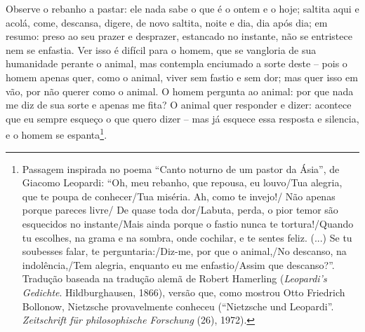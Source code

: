 Observe o rebanho a pastar: ele nada sabe o que é o ontem e o hoje;
saltita aqui e acolá, come, descansa, digere, de novo saltita, noite e
dia, dia após dia; em resumo: preso ao seu prazer e desprazer, estancado
no instante, não se entristece nem se enfastia. Ver isso é difícil para
o homem, que se vangloria de sua humanidade perante o animal, mas
contempla enciumado a sorte deste -- pois o homem apenas quer, como o
animal, viver sem fastio e sem dor; mas quer isso em vão, por não querer
como o animal. O homem pergunta ao animal: por que nada me diz de sua
sorte e apenas me fita? O animal quer responder e dizer: acontece que eu
sempre esqueço o que quero dizer -- mas já esquece essa resposta e
silencia, e o homem se espanta\footnote{Passagem inspirada no poema
  ``Canto noturno de um pastor da Ásia'', de Giacomo Leopardi: ``Oh, meu
  rebanho, que repousa, eu louvo/Tua alegria, que te poupa de
  conhecer/Tua miséria. Ah, como te invejo!/ Não apenas porque pareces
  livre/ De quase toda dor/Labuta, perda, o pior temor são esquecidos no
  instante/Mais ainda porque o fastio nunca te tortura!/Quando tu
  escolhes, na grama e na sombra, onde cochilar, e te sentes feliz.
  (...) Se tu soubesses falar, te perguntaria:/Diz-me, por que o
  animal,/No descanso, na indolência,/Tem alegria, enquanto eu me
  enfastio/Assim que descanso?''. Tradução baseada na tradução alemã de
  Robert Hamerling (\emph{Leopardi's Gedichte}. Hildburghausen, 1866),
  versão que, como mostrou Otto Friedrich Bollonow, Nietzsche
  provavelmente conheceu (``Nietzsche und Leopardi''. \emph{Zeitschrift
  für philosophische Forschung} (26), 1972).}.

